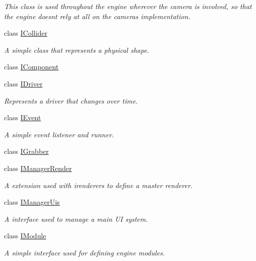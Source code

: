 \begin{DoxyCompactItemize}
\begin{DoxyCompactList}\small\item\em This class is used throughout the engine wherever the camera is involved, so that the engine doesn\textquotesingle{}t rely at all on the camera\textquotesingle{}s implementation. \end{DoxyCompactList}\item 
class \hyperlink{class_flounder_1_1_i_collider}{I\+Collider}
\begin{DoxyCompactList}\small\item\em A simple class that represents a physical shape. \end{DoxyCompactList}\item 
class \hyperlink{class_flounder_1_1_i_component}{I\+Component}
\item 
class \hyperlink{class_flounder_1_1_i_driver}{I\+Driver}
\begin{DoxyCompactList}\small\item\em Represents a driver that changes over time. \end{DoxyCompactList}\item 
class \hyperlink{class_flounder_1_1_i_event}{I\+Event}
\begin{DoxyCompactList}\small\item\em A simple event listener and runner. \end{DoxyCompactList}\item 
class \hyperlink{class_flounder_1_1_i_grabber}{I\+Grabber}
\item 
class \hyperlink{class_flounder_1_1_i_manager_render}{I\+Manager\+Render}
\begin{DoxyCompactList}\small\item\em A extension used with irenderers to define a master renderer. \end{DoxyCompactList}\item 
class \hyperlink{class_flounder_1_1_i_manager_uis}{I\+Manager\+Uis}
\begin{DoxyCompactList}\small\item\em A interface used to manage a main UI system. \end{DoxyCompactList}\item 
class \hyperlink{class_flounder_1_1_i_module}{I\+Module}
\begin{DoxyCompactList}\small\item\em A simple interface used for defining engine modules. \end{DoxyCompactList}\item 

\end{DoxyCompactItemize}
